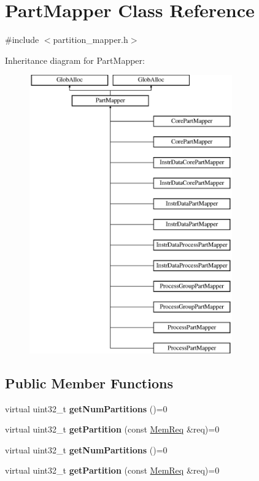 \hypertarget{classPartMapper}{\section{Part\-Mapper Class Reference}
\label{classPartMapper}
}


{\ttfamily \#include $<$partition\-\_\-mapper.\-h$>$}

Inheritance diagram for Part\-Mapper\-:\begin{figure}[H]
\begin{center}
\leavevmode
\includegraphics[height=12.000000cm]{classPartMapper}
\end{center}
\end{figure}
\subsection*{Public Member Functions}
\begin{DoxyCompactItemize}
\item 
\hypertarget{classPartMapper_af88ebbd6d9dfc527c27a5606039adf1d}{virtual uint32\-\_\-t {\bfseries get\-Num\-Partitions} ()=0}\label{classPartMapper_af88ebbd6d9dfc527c27a5606039adf1d}

\item 
\hypertarget{classPartMapper_a2b0db9f090b4bf8184c32f8782d1af73}{virtual uint32\-\_\-t {\bfseries get\-Partition} (const \hyperlink{structMemReq}{Mem\-Req} \&req)=0}\label{classPartMapper_a2b0db9f090b4bf8184c32f8782d1af73}

\item 
\hypertarget{classPartMapper_af88ebbd6d9dfc527c27a5606039adf1d}{virtual uint32\-\_\-t {\bfseries get\-Num\-Partitions} ()=0}\label{classPartMapper_af88ebbd6d9dfc527c27a5606039adf1d}

\item 
\hypertarget{classPartMapper_a2b0db9f090b4bf8184c32f8782d1af73}{virtual uint32\-\_\-t {\bfseries get\-Partition} (const \hyperlink{structMemReq}{Mem\-Req} \&req)=0}\label{classPartMapper_a2b0db9f090b4bf8184c32f8782d1af73}

\end{DoxyCompactItemize}


